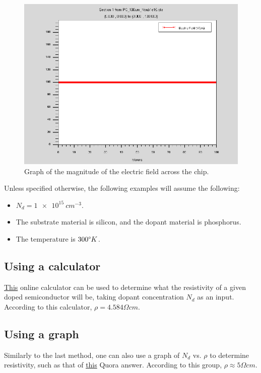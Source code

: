 \documentclass[12pt]{article}
\begin{document}
\begin{figure}[H]
  \centering
  \includegraphics[width=\textwidth]{efield}
  \caption{Graph of the magnitude of the electric field across the chip.}
  \label{fig:efield}
\end{figure}

Unless specified otherwise, the following examples will assume the following:
\begin{itemize}
  \item $N_d=\SI{1e15}{cm^{-3}}$.
  \item The substrate material is silicon, and the dopant material is phosphorus.
  \item The temperature is $300{\degree}K$.
\end{itemize}

\subsection{Using a calculator}
\href{https://www.pvlighthouse.com.au/resistivity}{This} online calculator can be used to determine what the resistivity of a given doped semiconductor will be, taking dopant concentration $N_d$ as an input. According to this calculator, $\rho=4.584{\Omega}cm$.

\subsection{Using a graph}
Similarly to the last method, one can also use a graph of $N_d$ vs. $\rho$ to determine resistivity, such as that of \href{https://www.quora.com/What-is-the-effect-of-doping-on-resistance}{this} Quora answer. According to this group, $\rho\approx5{\Omega}cm$.
\end{document}

